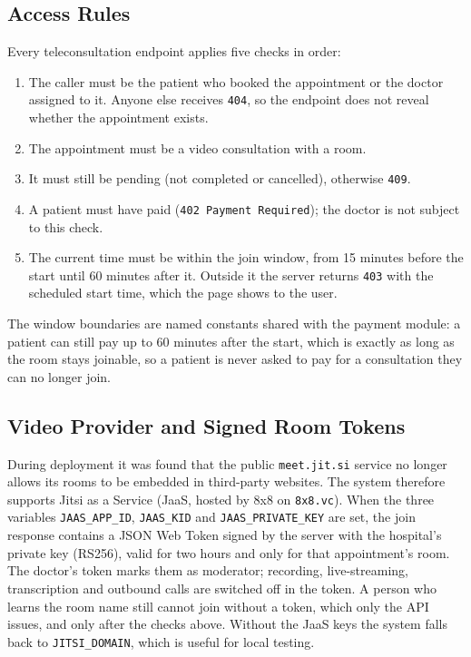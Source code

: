 \subsection{Access Rules}

Every teleconsultation endpoint applies five checks in order:
\begin{enumerate}
    \item The caller must be the patient who booked the appointment or the doctor assigned to it. Anyone else receives \texttt{404}, so the endpoint does not reveal whether the appointment exists.
    \item The appointment must be a video consultation with a room.
    \item It must still be pending (not completed or cancelled), otherwise \texttt{409}.
    \item A patient must have paid (\texttt{402 Payment Required}); the doctor is not subject to this check.
    \item The current time must be within the join window, from 15 minutes before the start until 60 minutes after it. Outside it the server returns \texttt{403} with the scheduled start time, which the page shows to the user.
\end{enumerate}

The window boundaries are named constants shared with the payment module: a patient can still pay up to 60 minutes after the start, which is exactly as long as the room stays joinable, so a patient is never asked to pay for a consultation they can no longer join.

\subsection{Video Provider and Signed Room Tokens}

During deployment it was found that the public \texttt{meet.jit.si} service no longer allows its rooms to be embedded in third-party websites. The system therefore supports Jitsi as a Service (JaaS, hosted by 8x8 on \texttt{8x8.vc}). When the three variables \texttt{JAAS\_APP\_ID}, \texttt{JAAS\_KID} and \texttt{JAAS\_PRIVATE\_KEY} are set, the join response contains a JSON Web Token signed by the server with the hospital's private key (RS256), valid for two hours and only for that appointment's room. The doctor's token marks them as moderator; recording, live-streaming, transcription and outbound calls are switched off in the token. A person who learns the room name still cannot join without a token, which only the API issues, and only after the checks above. Without the JaaS keys the system falls back to \texttt{JITSI\_DOMAIN}, which is useful for local testing.


